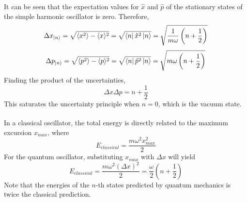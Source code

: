\begin{sol}
\begin{enumerate}[label=\textbf{(\alph*)}]
It can be seen that the expectation values for $\hat x$ and $\hat p$ of the stationary states of the simple harmonic oscillator is zero. Therefore,
\begin{equation}
	\Delta x_{\ket n}=\sqrt{\langle x^2\rangle-\langle x\rangle^2}=\sqrt{\bra n\hat x^2\ket n}=\sqrt{\frac{1}{m\omega}\left(n+\frac{1}{2}\right) }
\end{equation}
\begin{equation}
	\Delta p_{\ket n}=\sqrt{\langle p^2\rangle-\langle p\rangle^2}=\sqrt{\bra n\hat p^2\ket n}=\sqrt{m\omega\left(n+\frac{1}{2}\right)} 
\end{equation}
Finding the product of the uncertainties,
\begin{equation}
	\Delta x\Delta p=n+\frac{1}{2}
\end{equation} 
This saturates the uncertainty principle when $n=0$, which is the vacuum state.\\\\
In a classical oscillator, the total energy is directly related to the maximum excursion $x_{max}$, where 
\begin{equation}
	E_{classical}=\frac{m\omega^2x_{max}^2}{2}
\end{equation} 
For the quantum oscillator, substituting $x_{max}$ with $\Delta x$ will yield
\begin{equation}
	E_{classical}=\frac{m\omega^2(\Delta x)^2}{2}=\frac{\omega}{2}\left(n+\frac{1}{2}\right)
\end{equation}
Note that the energies of the $n$-th states predicted by quantum mechanics is twice the classical prediction. 
\end{enumerate}
\end{sol}